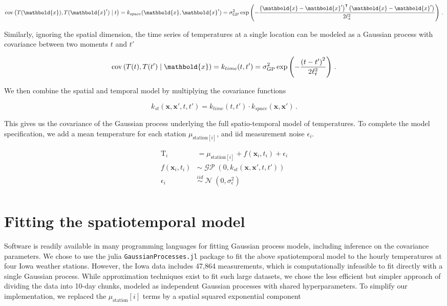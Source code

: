 \documentclass[letter]{article}
\newcommand{\genericdel}[3]{%
      \left#1#3\right#2
    }
\newcommand{\del}[1]{\genericdel(){#1}}
\newcommand{\sbr}[1]{\genericdel[]{#1}}
\DeclareMathOperator{\cov}{{cov}}
\DeclareMathOperator{\normal}{\mathcal{N}}
\DeclareMathOperator{\GP}{\mathcal{GP}}
\newcommand{\T}{\mathrm{T}}
\newcommand{\station}[1]{\mathrm{station}\sbr{#1}}
\newcommand{\xvec}{\mathbold{x}}
\newcommand{\iid}{iid}
\newcommand{\trans}{^{\intercal}}
\newcommand{\sigmaf}{\sigma_{\mathrm{GP}}}
\newcommand{\sigman}{\sigma_{\epsilon}}
\begin{document}
\begin{equation}
    \label{eq:kspace}
    \cov\del{T(\xvec), T(\xvec') \mid t} = k_{space}(\xvec, \xvec') = \sigmaf^2 \exp\del{-\frac{\del{\xvec-\xvec'}\trans\del{\xvec-\xvec'}}{2\ell_x^2}}\,.
\end{equation}

Similarly, ignoring the spatial dimension, the time series of
temperatures at a single location can be modeled as a Gaussian process
with covariance between two moments \(t\) and \(t'\)

\begin{equation}
\cov\del{T(t), T(t') \mid \xvec} = k_{time}(t, t') = \sigmaf^2 \exp\del{-\frac{\del{t-t'}^2}{2\ell_t^2}}\,.
\end{equation}

We then combine the spatial and temporal model by multiplying the
covariance functions

\begin{equation}
k_{st}(\xvec,\xvec',t,t') = k_{time}(t,t') \cdot k_{space}(\xvec, \xvec')\,.
\end{equation}

This gives us the covariance of the Gaussian process underlying the full
spatio-temporal model of temperatures. To complete the model
specification, we add a mean temperature for each station
\(\mu_{\station{i}}\), and iid measurement noise \(\epsilon_i\).

\begin{align}
    \T_i &= \mu_{\station{i}} + f(\xvec_i, t_i) + \epsilon_i\\
    f(\xvec_i, t_i) &\sim \GP\del{0, k_{st}(\xvec,\xvec',t,t')}\\
    \epsilon_i &\overset{\iid}{\sim} \normal\del{0,\sigman^2}\\
\end{align}
    


    	\section{Fitting the spatiotemporal
model}\label{fitting-the-spatiotemporal-model}

Software is readily available in many programming languages for fitting
Gaussian process models, including inference on the covariance
parameters. We chose to use the julia \texttt{GaussianProcesses.jl}
package to fit the above spatiotemporal model to the hourly temperatures
at four Iowa weather stations. However, the Iowa data includes 47,864
measurements, which is computationally infeasible to fit directly with a
single Gaussian process. While approximation techniques exist to fit
such large datasets, we chose the less efficient but simpler approach of
dividing the data into 10-day chunks, modeled as independent Gaussian
processes with shared hyperparameters. To simplify our implementation,
we replaced the \(\mu_\station{i}\) terms by a spatial squared
exponential component
\end{document}
